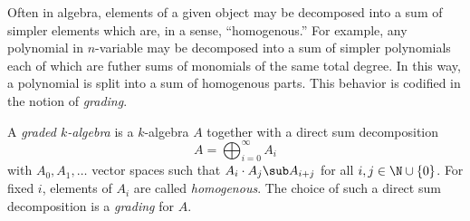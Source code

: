 \documentclass[12pt]{article}
\begin{document}
%
%

Often in algebra, elements of a given object may be decomposed into a sum of simpler elements which are, in a sense, ``homogenous.'' For example, any polynomial in $ n $-variable may be decomposed into a sum of simpler polynomials each of which are futher sums of monomials of the same total degree.  In this way, a polynomial is split into a sum of homogenous parts. This behavior is codified in the notion of \textit{grading}.

\begin{definition}\label{def:gralg}
A \textit{graded $ k $-algebra} is a $ k $-algebra $ A $ together with a direct sum decomposition
\[
  A = \bigoplus_{i=0}^{\infty} A_{i}
\]
with $ A_{0},A_{1},\ldots $ vector spaces such that $ A_{i}\cdot A_{j}\sub A_{i+j} $ for all $ i,j\in \N\cup\{0\} $. For fixed $ i $, elements of $ A_{i} $ are called \textit{homogenous}. The choice of such a direct sum decomposition is a \textit{grading} for $ A $.
\end{definition}
\end{document}
